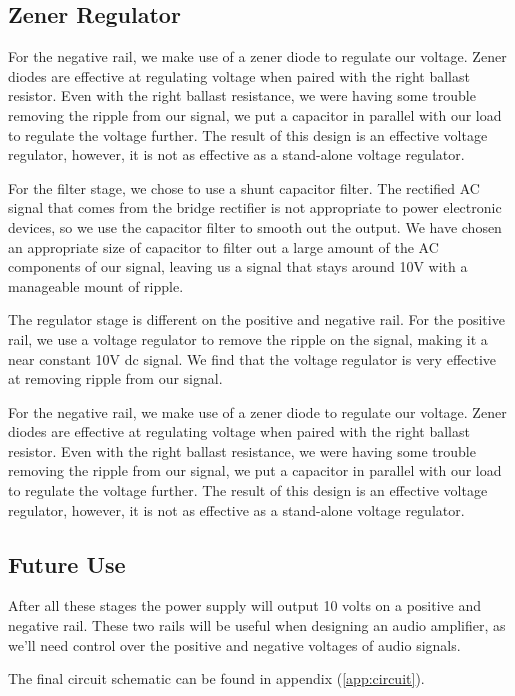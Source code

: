 \documentclass[12pt]{article}
\begin{document}
\subsection{Zener Regulator}
For the negative rail, we make use of a zener diode to regulate our voltage. Zener diodes are effective at regulating voltage when paired with the right ballast resistor. Even 
with the right ballast resistance, we were having some trouble removing the ripple from our signal, we put a capacitor in parallel with our load to regulate the voltage further. 
The result of this design is an effective voltage regulator, however, it is not as effective as a stand-alone voltage regulator.

For the filter stage, we chose to use a shunt capacitor filter. The rectified AC signal that comes from the bridge rectifier is not appropriate to power electronic devices, so we use the capacitor filter to smooth out the output. We have chosen 
an appropriate size of capacitor to filter out a large amount of the AC components of our signal, leaving us a signal that stays around 10V with a manageable mount of ripple.

The regulator stage is different on the positive and negative rail. For the positive rail, we use a voltage regulator to remove the ripple on the signal, making it a near constant 10V dc signal. We find that the voltage regulator is very effective at removing 
ripple from our signal.

For the negative rail, we make use of a zener diode to regulate our voltage. Zener diodes are effective at regulating voltage when paired with the right ballast resistor. Even with the right ballast resistance, we were having some trouble removing the ripple from our signal, 
we put a capacitor in parallel with our load to regulate the voltage further. The result of this design is an effective voltage regulator, however, it is not as effective as a stand-alone voltage regulator.

\subsection{Future Use}
After all these stages the power supply will output 10 volts on a positive and negative rail. These two rails will be useful when designing an audio amplifier, as we'll need control over the 
positive and negative voltages of audio signals.


The final circuit schematic can be found in appendix (\ref{app:circuit}).
\end{document}
